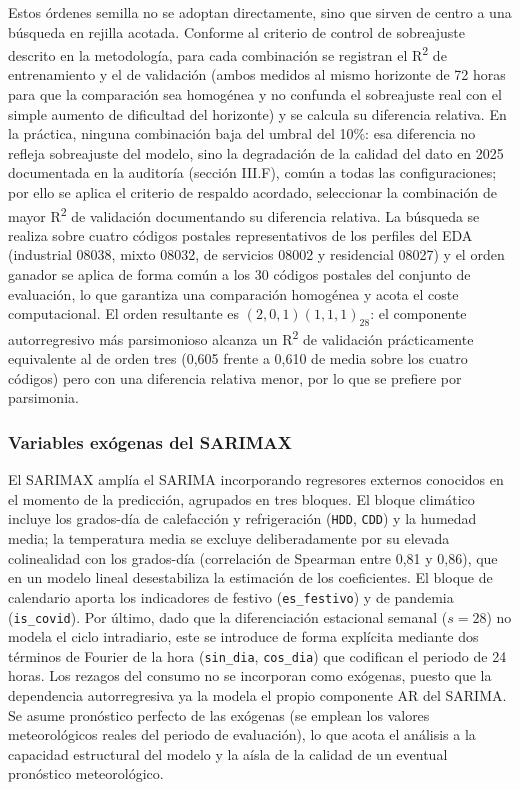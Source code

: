 \documentclass[12pt, a4paper]{article}
\begin{document}
Estos órdenes semilla no se adoptan directamente, sino que sirven de centro a una búsqueda en rejilla acotada. Conforme al criterio de control de sobreajuste descrito en la metodología, para cada combinación se registran el R\textsuperscript{2} de entrenamiento y el de validación (ambos medidos al mismo horizonte de 72 horas para que la comparación sea homogénea y no confunda el sobreajuste real con el simple aumento de dificultad del horizonte) y se calcula su diferencia relativa. En la práctica, ninguna combinación baja del umbral del 10\%: esa diferencia no refleja sobreajuste del modelo, sino la degradación de la calidad del dato en 2025 documentada en la auditoría (sección III.F), común a todas las configuraciones; por ello se aplica el criterio de respaldo acordado, seleccionar la combinación de mayor R\textsuperscript{2} de validación documentando su diferencia relativa. La búsqueda se realiza sobre cuatro códigos postales representativos de los perfiles del EDA (industrial 08038, mixto 08032, de servicios 08002 y residencial 08027) y el orden ganador se aplica de forma común a los 30 códigos postales del conjunto de evaluación, lo que garantiza una comparación homogénea y acota el coste computacional. El orden resultante es $(2,0,1)(1,1,1)_{28}$: el componente autorregresivo más parsimonioso alcanza un R\textsuperscript{2} de validación prácticamente equivalente al de orden tres (0,605 frente a 0,610 de media sobre los cuatro códigos) pero con una diferencia relativa menor, por lo que se prefiere por parsimonia.

\subsubsection{Variables exógenas del SARIMAX}


El SARIMAX amplía el SARIMA incorporando regresores externos conocidos en el momento de la predicción, agrupados en tres bloques. El bloque climático incluye los grados-día de calefacción y refrigeración (\texttt{HDD}, \texttt{CDD}) y la humedad media; la temperatura media se excluye deliberadamente por su elevada colinealidad con los grados-día (correlación de Spearman entre 0,81 y 0,86), que en un modelo lineal desestabiliza la estimación de los coeficientes. El bloque de calendario aporta los indicadores de festivo (\texttt{es\_festivo}) y de pandemia (\texttt{is\_covid}). Por último, dado que la diferenciación estacional semanal ($s=28$) no modela el ciclo intradiario, este se introduce de forma explícita mediante dos términos de Fourier de la hora (\texttt{sin\_dia}, \texttt{cos\_dia}) que codifican el periodo de 24 horas. Los rezagos del consumo no se incorporan como exógenas, puesto que la dependencia autorregresiva ya la modela el propio componente AR del SARIMA. Se asume pronóstico perfecto de las exógenas (se emplean los valores meteorológicos reales del periodo de evaluación), lo que acota el análisis a la capacidad estructural del modelo y la aísla de la calidad de un eventual pronóstico meteorológico.
\end{document}
